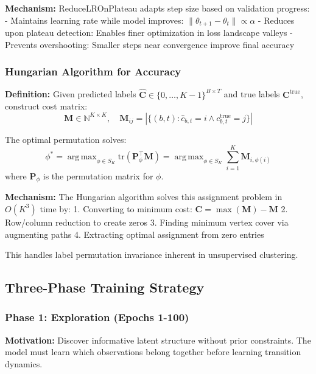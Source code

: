 \documentclass[11pt]{article}
\DeclareMathOperator*{\argmax}{arg\,max}
\begin{document}
\textbf{Mechanism:}
ReduceLROnPlateau adapts step size based on validation progress:
- Maintains learning rate while model improves: $\|\theta_{t+1} - \theta_t\| \propto \alpha$
- Reduces upon plateau detection: Enables finer optimization in loss landscape valleys
- Prevents overshooting: Smaller steps near convergence improve final accuracy

\subsubsection{Hungarian Algorithm for Accuracy}

\textbf{Definition:}
Given predicted labels $\hat{\mathbf{C}} \in \{0,\ldots,K-1\}^{B \times T}$ and true labels $\mathbf{C}^{\text{true}}$, construct cost matrix:
\begin{equation}
\mathbf{M} \in \mathbb{N}^{K \times K}, \quad \mathbf{M}_{ij} = |\{(b,t) : \hat{c}_{b,t} = i \land c_{b,t}^{\text{true}} = j\}|
\end{equation}

The optimal permutation solves:
\begin{equation}
\phi^* = \argmax_{\phi \in S_K} \text{tr}(\mathbf{P}_\phi^\top \mathbf{M}) = \argmax_{\phi \in S_K} \sum_{i=1}^K \mathbf{M}_{i,\phi(i)}
\end{equation}
where $\mathbf{P}_\phi$ is the permutation matrix for $\phi$.

\textbf{Mechanism:}
The Hungarian algorithm solves this assignment problem in $O(K^3)$ time by:
1. Converting to minimum cost: $\mathbf{C} = \max(\mathbf{M}) - \mathbf{M}$
2. Row/column reduction to create zeros
3. Finding minimum vertex cover via augmenting paths
4. Extracting optimal assignment from zero entries

This handles label permutation invariance inherent in unsupervised clustering.

\subsection{Three-Phase Training Strategy}

\subsubsection{Phase 1: Exploration (Epochs 1-100)}

\textbf{Motivation:}
Discover informative latent structure without prior constraints. The model must learn which observations belong together before learning transition dynamics.
\end{document}
